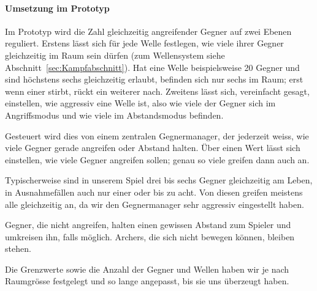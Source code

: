 \documentclass[../Main.tex]{subfiles}
\begin{document}
\paragraph{Umsetzung im Prototyp}
Im Prototyp wird die Zahl gleichzeitig angreifender Gegner auf zwei Ebenen reguliert. Erstens lässt sich für jede Welle festlegen, wie viele ihrer Gegner gleichzeitig im Raum sein dürfen (zum Wellensystem siehe Abschnitt~\ref{sec:Kampfabschnitt}). Hat eine Welle beispielsweise 20 Gegner und sind höchstens sechs gleichzeitig erlaubt, befinden sich nur sechs im Raum; erst wenn einer stirbt, rückt ein weiterer nach. Zweitens lässt sich, vereinfacht gesagt, einstellen, wie aggressiv eine Welle ist, also wie viele der Gegner sich im Angriffsmodus und wie viele im Abstandsmodus befinden.

Gesteuert wird dies von einem zentralen Gegnermanager, der jederzeit weiss, wie viele Gegner gerade angreifen oder Abstand halten. Über einen Wert lässt sich einstellen, wie viele Gegner angreifen sollen; genau so viele greifen dann auch an.

Typischerweise sind in unserem Spiel drei bis sechs Gegner gleichzeitig am Leben, in Ausnahmefällen auch nur einer oder bis zu acht. Von diesen greifen meistens alle gleichzeitig an, da wir den Gegnermanager sehr aggressiv eingestellt haben.

Gegner, die nicht angreifen, halten einen gewissen Abstand zum Spieler und umkreisen ihn, falls möglich. Archers, die sich nicht bewegen können, bleiben stehen.

Die Grenzwerte sowie die Anzahl der Gegner und Wellen haben wir je nach Raumgrösse festgelegt und so lange angepasst, bis sie uns überzeugt haben.
\end{document}
